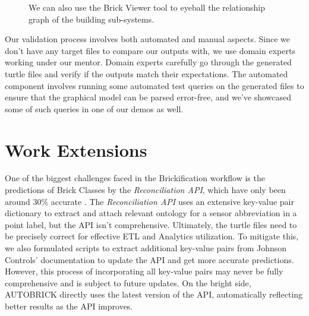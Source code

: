 \documentclass[twocolumn, switch]{article} %
\begin{document}
\begin{figure}[H]
  \centering
  \caption{We can also use the Brick Viewer tool
  \cite{brick_ttl_viewer} to eyeball the relationship graph of the building sub-systems.}
  \label{fig:fig3}
\end{figure}


Our validation process involves both automated and manual aspects. Since we don't have any target files to compare our outputs with, we use domain experts working under our mentor. Domain experts carefully go through the generated turtle files and verify if the outputs match their expectations. The automated component involves running some automated test queries on the generated files to ensure that the graphical model can be parsed error-free, and we’ve showcased some of such queries in one of our demos as well.

\section{Work Extensions}
One of the biggest challenges faced in the Brickification workflow is the
predictions of Brick Classes by the \emph{Reconciliation API}, which have only been
around 30\% accurate \cite{gtfierro225_2020}. The \emph{Reconciliation API} uses an extensive key-value pair dictionary to extract and attach relevant ontology for a sensor abbreviation in a point label, but the API isn’t comprehensive. Ultimately, the turtle files need to be precisely correct for effective ETL and Analytics utilization. To mitigate this, we also formulated scripts to extract additional key-value pairs from Johnson Controls’ documentation to update the API and get more accurate predictions. However, this process of incorporating all key-value pairs may never be fully comprehensive and is subject to future updates. On the bright side, AUTOBRICK directly uses the latest version of the API, automatically reflecting better results as the API improves. 
\end{document}
